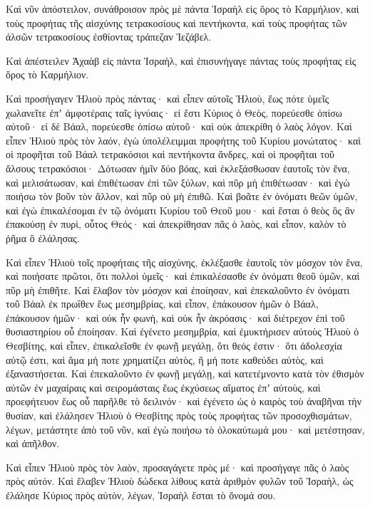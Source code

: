{Καὶ νῦν ἀπόστειλον, συνάθροισον πρὸς μὲ πάντα Ἰσραὴλ εἰς ὄρος τὸ Καρμήλιον, καὶ τοὺς προφήτας τῆς αἰσχύνης τετρακοσίους καὶ πεντήκοντα, καὶ τοὺς προφήτας τῶν ἀλσῶν τετρακοσίους ἐσθίοντας τράπεζαν Ἰεζάβελ.
\par }{\PP {}Καὶ ἀπέστειλεν Ἀχαὰβ εἰς πάντα Ἰσραὴλ, καὶ ἐπισυνήγαγε πάντας τοὺς προφήτας εἰς ὄρος τὸ Καρμήλιον.
\par }{\PP {}Καὶ προσήγαγεν Ἠλιοὺ πρὸς πάντας· καὶ εἶπεν αὐτοῖς Ἠλιοὺ, ἕως πότε ὑμεῖς χωλανεῖτε ἐπʼ ἀμφοτέραις ταῖς ἰγνύαις· εἰ ἔστι Κύριος ὁ Θεὸς, πορεύεσθε ὀπίσω αὐτοῦ· εἰ δὲ Βάαλ, πορεύεσθε ὀπίσω αὐτοῦ· καὶ οὐκ ἀπεκρίθη ὁ λαὸς λόγον.
Καὶ εἶπεν Ἠλιοὺ πρὸς τὸν λαόν, ἐγὼ ὑπολέλειμμαι προφήτης τοῦ Κυρίου μονώτατος· καὶ οἱ προφῆται τοῦ Βάαλ τετρακόσιοι καὶ πεντήκοντα ἄνδρες, καὶ οἱ προφῆται τοῦ ἄλσους τετρακόσιοι·
Δότωσαν ἡμῖν δύο βόας, καὶ ἐκλεξάσθωσαν ἑαυτοῖς τὸν ἕνα, καὶ μελισάτωσαν, καὶ ἐπιθέτωσαν ἐπὶ τῶν ξύλων, καὶ πῦρ μὴ ἐπιθέτωσαν· καὶ ἐγὼ ποιήσω τὸν βοῦν τὸν ἄλλον, καὶ πῦρ οὐ μὴ ἐπιθῶ.
Καὶ βοᾶτε ἐν ὀνόματι θεῶν ὑμῶν, καὶ ἐγὼ ἐπικαλέσομαι ἐν τῷ ὀνόματι Κυρίου τοῦ Θεοῦ μου· καὶ ἔσται ὁ θεὸς ὃς ἂν ἐπακούσῃ ἐν πυρὶ, οὗτος Θεός· καὶ ἀπεκρίθησαν πᾶς ὁ λαὸς, καὶ εἶπον, καλὸν τὸ ῥῆμα ὃ ἐλάλησας.
\par }{\PP {}Καὶ εἶπεν Ἠλιοὺ τοῖς προφήταις τῆς αἰσχύνης, ἐκλέξασθε ἑαυτοῖς τὸν μόσχον τὸν ἕνα, καὶ ποιήσατε πρῶτοι, ὅτι πολλοὶ ὑμεῖς· καὶ ἐπικαλέσασθε ἐν ὀνόματι θεοῦ ὑμῶν, καὶ πῦρ μὴ ἐπιθῆτε.
Καὶ ἔλαβον τὸν μόσχον καὶ ἐποίησαν, καὶ ἐπεκαλοῦντο ἐν ὀνόματι τοῦ Βάαλ ἐκ πρωΐθεν ἕως μεσημβρίας, καὶ εἶπον, ἐπάκουσον ἡμῶν ὁ Βάαλ, ἐπάκουσον ἡμῶν· καὶ οὐκ ἦν φωνὴ, καὶ οὐκ ἦν ἀκρόασις· καὶ διέτρεχον ἐπὶ τοῦ θυσιαστηρίου οὗ ἐποίησαν.
Καὶ ἐγένετο μεσημβρία, καὶ ἐμυκτήρισεν αὐτοὺς Ἠλιοὺ ὁ Θεσβίτης, καὶ εἶπεν, ἐπικαλεῖσθε ἐν φωνῇ μεγάλῃ, ὅτι θεός ἐστιν· ὅτι ἀδολεσχία αὐτῷ ἐστι, καὶ ἅμα μή ποτε χρηματίζει αὐτὸς, ἢ μή ποτε καθεύδει αὐτὸς, καὶ ἐξαναστήσεται.
Καὶ ἐπεκαλοῦντο ἐν φωνῇ μεγάλῃ, καὶ κατετέμνοντο κατὰ τὸν ἐθισμὸν αὐτῶν ἐν μαχαίραις καὶ σειρομάσταις ἕως ἐκχύσεως αἵματος ἐπʼ αὐτοὺς,
καὶ προεφήτευον ἕως οὗ παρῆλθε τὸ δειλινόν· καὶ ἐγένετο ὡς ὁ καιρὸς τοὺ ἀναβῆναι τὴν θυσίαν, καὶ ἐλάλησεν Ἠλιοὺ ὁ Θεσβίτης πρὸς τοὺς προφήτας τῶν προσοχθισμάτων, λέγων, μετάστητε ἀπὸ τοῦ νῦν, καὶ ἐγὼ ποιήσω τὸ ὁλοκαύτωμά μου· καὶ μετέστησαν, καὶ ἀπῆλθον.
\par }{\PP {}Καὶ εἶπεν Ἠλιοὺ πρὸς τὸν λαὸν, προσαγάγετε πρὸς μέ· καὶ προσήγαγε πᾶς ὁ λαὸς πρὸς αὐτόν.
Καὶ ἔλαβεν Ἡλιοὺ δώδεκα λίθους κατὰ ἀριθμὸν φυλῶν τοῦ Ἰσραὴλ, ὡς ἐλάλησε Κύριος πρὸς αὐτὸν, λέγων, Ἰσραὴλ ἔσται τὸ ὄνομά σου.
}
